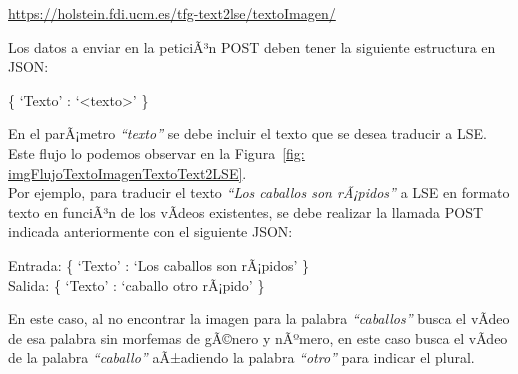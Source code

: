 \begin{shaded}
	\url{https://holstein.fdi.ucm.es/tfg-text2lse/textoImagen/  }	
\end{shaded}


Los datos a enviar en la peticiÃ³n POST deben tener la siguiente estructura en JSON: 
\begin{center}
	
	\{ `Texto' : `<texto>' \}
	
\end{center}


En el parÃ¡metro \textit{``texto''} se debe incluir el texto que se desea traducir a LSE. Este flujo lo podemos observar en la Figura~\ref {fig: imgFlujoTextoImagenTextoText2LSE}.\\

Por ejemplo, para traducir el texto \textit{``Los caballos son rÃ¡pidos''} a LSE en formato texto en funciÃ³n de los vÃ­deos existentes, se debe realizar la llamada POST indicada anteriormente con el siguiente JSON:


\begin{center}
	Entrada: \{ `Texto' : `Los caballos son rÃ¡pidos' \} \\
	Salida: \{ `Texto' : `caballo otro rÃ¡pido' \}
\end{center}

En este caso, al no encontrar la imagen para la palabra \textit{``caballos''} busca el vÃ­deo de esa palabra sin morfemas de gÃ©nero y nÃºmero, en este caso busca el vÃ­deo de la palabra \textit{``caballo''} aÃ±adiendo la palabra  \textit{``otro''} para indicar el plural.


